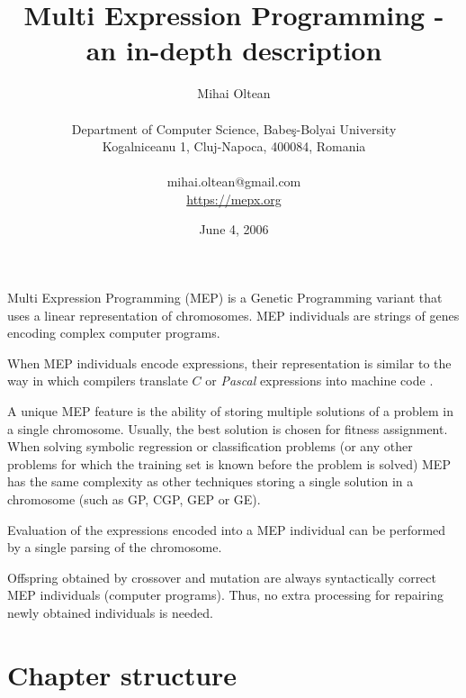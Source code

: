\documentclass [11pt]{article}
\begin{document}
\title{Multi Expression Programming - an in-depth description}
\label{mep_chapter}

\author{Mihai Oltean\\
\\
Department of Computer Science, Babe\c s-Bolyai University\\
Kogalniceanu 1, Cluj-Napoca, 400084, Romania\\
\\
mihai.oltean@gmail.com\\
\url{https://mepx.org}
}

\date{June 4, 2006}

\maketitle



Multi Expression Programming (MEP) \cite{oltean_complex, oltean_mep_eea,oltean_improving,oltean_circuits_nasa} is a Genetic Programming variant that uses a linear representation of chromosomes. MEP individuals are strings of genes encoding complex computer programs.

When MEP individuals encode expressions, their representation is similar to 
the way in which compilers translate $C$ or \textit{Pascal} expressions into machine code \cite{aho1}. 

A unique MEP feature is the ability of storing multiple solutions of a 
problem in a single chromosome. Usually, the best solution is chosen for 
fitness assignment. When solving symbolic regression or classification 
problems (or any other problems for which the training set is known before 
the problem is solved) MEP has the same complexity as other techniques 
storing a single solution in a chromosome (such as GP, CGP, GEP or GE).

Evaluation of the expressions encoded into a MEP individual can be performed 
by a single parsing of the chromosome.

Offspring obtained by crossover and mutation are 
always syntactically correct MEP individuals (computer programs). Thus, no 
extra processing for repairing newly obtained individuals is needed.

\section{Chapter structure}
\end{document}

